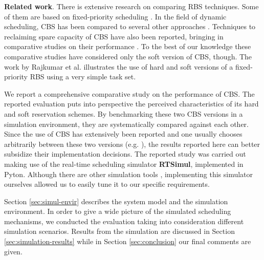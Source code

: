 \documentclass[times, 10pt,twocolumn]{article}
\newcommand{\simul}{\textbf{RTSimul}} %
\begin{document}
\textbf{Related work}. There is extensive research on comparing RBS
techniques.  Some of them are based on fixed-priority scheduling
\cite{bernat.ea99:new,bernat.ea02:multiple,davis.ea05:hierarchical,davis.ea95:dual}.
In the field of dynamic scheduling, CBS has been compared to several
other approaches \cite{spuri.ea96:scheduling}.  Techniques to
reclaiming spare capacity of CBS have also been reported, bringing in
comparative studies on their performance
\cite{caccamo.ea00:capacity,lin.ea05:improving}. To the best of our
knowledge these comparative studies have considered only the soft
version of CBS, though.  The work by Rajkumar et
al. \cite{rajkumar.ea01:resource} illustrates the use of hard and soft
versions of a fixed-priority RBS using a very simple task set.

\label{sec:contr-this-paper}

We report a comprehensive comparative study on the performance of
CBS. The reported evaluation puts into perspective the perceived
characteristics of its hard and soft reservation schemes.  By
benchmarking these two CBS versions in a simulation environment, they
are systematically compared against each other.  Since the use of CBS
has extensively been reported and one usually chooses arbitrarily
between these two versions
(e.g. \cite{abeni.ea99:adaptive,abeni.ea05:qos}), the results reported
here can better subsidize their implementation decisions.  The
reported study was carried out making use of the real-time scheduling
simulator \simul{}, implemented in Pyton. Although there are other
simulation tools \cite{ancilotti.ea96:flexible}, implementing this
simulator ourselves allowed us to easily tune it to our specific
requirements.

\label{sec:structure-this-paper}

Section \ref{sec:simul-envir} describes the system model and the
simulation environment.  In order to give a wide picture of the
simulated scheduling mechanisms, we conducted the evaluation taking
into consideration different simulation scenarios. Results from the
simulation are discussed in Section \ref{sec:simulation-results} while
in Section \ref{sec:conclusion} our final comments are given.

\label{sec:soft-hard-cbs}
\end{document}
